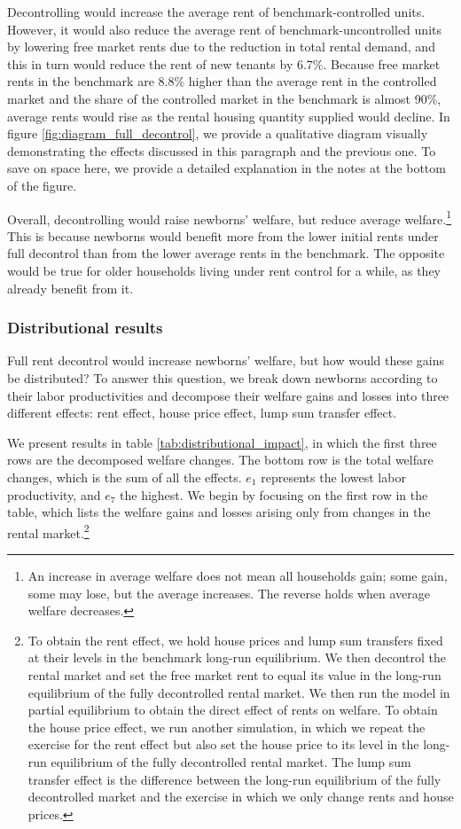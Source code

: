 \documentclass[parskip=full]{article}
\begin{document}
Decontrolling would increase the average rent of benchmark-controlled units. However, it would also reduce the average rent of benchmark-uncontrolled units by lowering free market rents due to the reduction in total rental demand, and this in turn would reduce the rent of new tenants by 6.7\%. Because free market rents in the benchmark are 8.8\% higher than the average rent in the controlled market and the share of the controlled market in the benchmark is almost 90\%, average rents would rise as the rental housing quantity supplied would decline. In figure \ref{fig:diagram_full_decontrol}, we provide a qualitative diagram visually demonstrating the effects discussed in this paragraph and the previous one. To save on space here, we provide a detailed explanation in the notes at the bottom of the figure.

Overall, decontrolling would raise newborns' welfare, but reduce average welfare.\footnote{An increase in average welfare does not mean all households gain; some gain, some may lose, but the average increases. The reverse holds when average welfare decreases.} This is because newborns would benefit more from the lower initial rents under full decontrol than from the lower average rents in the benchmark. The opposite would be true for older households living under rent control for a while, as they already benefit from it. 

\subsubsection{Distributional results} 

Full rent decontrol would increase newborns' welfare, but how would these gains be distributed? To answer this question, we break down newborns according to their labor productivities and decompose their welfare gains and losses into three different effects: rent effect, house price effect, lump sum transfer effect. 

We present results in table \ref{tab:distributional_impact}, in which the first three rows are the decomposed welfare changes. The bottom row is the total welfare changes, which is the sum of all the effects. $e_{1}$ represents the lowest labor productivity, and $e_{7}$ the highest. We begin by focusing on the first row in the table, which lists the welfare gains and losses arising only from changes in the rental market.\footnote{To obtain the rent effect, we hold house prices and lump sum transfers fixed at their levels in the benchmark long-run equilibrium. We then decontrol the rental market and set the free market rent to equal its value in the long-run equilibrium of the fully decontrolled rental market. We then run the model in partial equilibrium to obtain the direct effect of rents on welfare. To obtain the house price effect, we run another simulation, in which we repeat the exercise for the rent effect but also set the house price to its level in the long-run equilibrium of the fully decontrolled rental market. The lump sum transfer effect is the difference between the long-run equilibrium of the fully decontrolled market and the exercise in which we only change rents and house prices.} 
\end{document}

